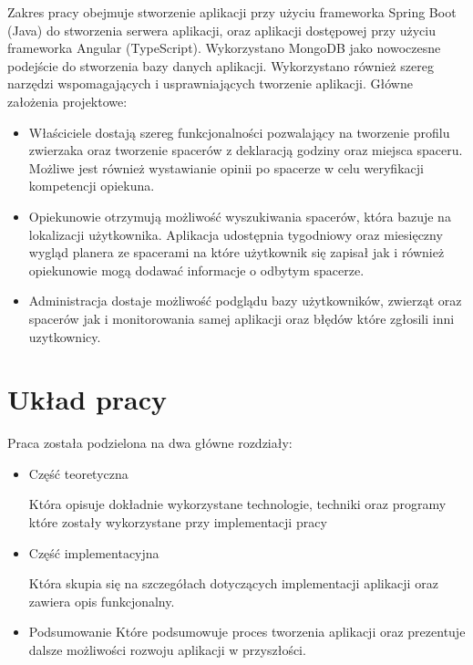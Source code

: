 Zakres pracy obejmuje stworzenie aplikacji przy użyciu frameworka Spring Boot (Java) do stworzenia serwera aplikacji, oraz aplikacji dostępowej przy użyciu frameworka Angular (TypeScript). Wykorzystano MongoDB jako nowoczesne podejście do stworzenia bazy danych aplikacji. Wykorzystano również szereg narzędzi wspomagających i usprawniających tworzenie aplikacji.
Główne założenia projektowe:
\begin{itemize}
    \item Właściciele dostają szereg funkcjonalności pozwalający na tworzenie profilu zwierzaka oraz tworzenie spacerów z deklaracją godziny oraz miejsca spaceru. Możliwe jest również wystawianie opinii po spacerze w celu weryfikacji kompetencji opiekuna.
    \item Opiekunowie otrzymują możliwość wyszukiwania spacerów, która bazuje na lokalizacji użytkownika. Aplikacja udostępnia tygodniowy oraz miesięczny wygląd planera ze spacerami na które użytkownik się zapisał jak i również opiekunowie mogą dodawać informacje o odbytym spacerze.
    \item Administracja dostaje możliwość podglądu bazy użytkowników, zwierząt oraz spacerów jak i monitorowania samej aplikacji oraz błędów które zgłosili inni uzytkownicy.
\end{itemize}

\section{Układ pracy}
Praca została podzielona na dwa główne rozdziały:
\begin{itemize}
    \item Część teoretyczna
    
    Która opisuje dokładnie wykorzystane technologie, techniki oraz programy które zostały wykorzystane przy implementacji pracy

    \item Część implementacyjna
    
    Która skupia się na szczegółach dotyczących implementacji aplikacji oraz zawiera opis funkcjonalny.

    \item Podsumowanie
    Które podsumowuje proces tworzenia aplikacji oraz prezentuje dalsze możliwości rozwoju aplikacji w przyszłości.
\end{itemize}

